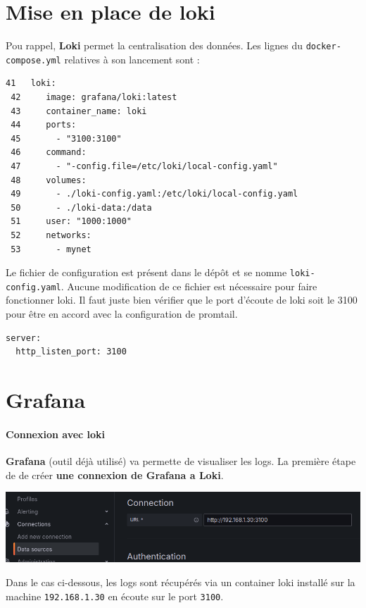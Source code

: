 \documentclass[french, 12pt]{article}%
\begin{document}
% 

\section{Mise en place de loki}

Pou rappel, \textbf{Loki} permet la centralisation des données. Les lignes du \verb?docker-compose.yml? relatives à son lancement sont : 
\begin{lstlisting}[style=commande]
 41   loki:
 42     image: grafana/loki:latest
 43     container_name: loki
 44     ports:
 45       - "3100:3100"
 46     command:
 47       - "-config.file=/etc/loki/local-config.yaml"
 48     volumes:
 49       - ./loki-config.yaml:/etc/loki/local-config.yaml
 50       - ./loki-data:/data       
 51     user: "1000:1000"
 52     networks:
 53       - mynet
\end{lstlisting}


Le fichier de configuration est présent dans le dépôt et se nomme \verb?loki-config.yaml?. Aucune modification de ce fichier est nécessaire pour faire fonctionner loki. Il faut juste bien vérifier que le port d'écoute de loki soit le 3100
pour être en accord avec la configuration de promtail.
\begin{lstlisting}[style=commande]
server:
  http_listen_port: 3100
\end{lstlisting}



\section{Grafana}




\paragraph{Connexion avec loki}
\textbf{Grafana} (outil déjà utilisé) va permette de visualiser les logs. La première étape de de créer \textbf{une connexion de Grafana a Loki}. 

\begin{center}
\includegraphics[scale=0.7]{./ressource/grafanRef_loki}
\end{center}
Dans le cas  ci-dessous, les logs sont récupérés via un container loki installé sur la machine \verb?192.168.1.30? en écoute sur le port \verb?3100?.
\end{document}
